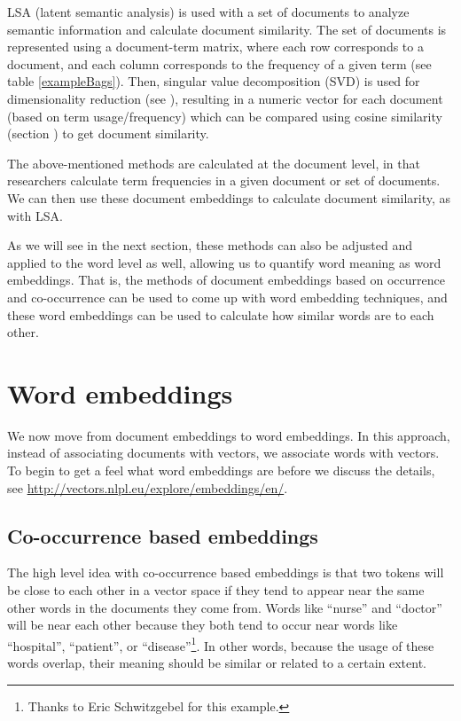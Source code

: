 LSA (latent semantic analysis) is used with a set of documents to analyze semantic information and calculate document similarity. The set of documents is represented using a document-term matrix, where each row corresponds to a document, and each column corresponds to the frequency of a given term (see table \ref{exampleBags}). Then, singular value decomposition (SVD) is used for dimensionality reduction (see ), resulting in a numeric vector for each document (based on term usage/frequency) which can be compared using cosine similarity (section ) to get document similarity.

The above-mentioned methods are calculated at the document level, in that researchers calculate term frequencies in a given document or set of documents. We can then use these document embeddings to calculate document similarity, as with LSA.

As we will see in the next section, these methods can also be adjusted and applied to the word level as well, allowing us to quantify word meaning as word embeddings. That is, the methods of document embeddings based on occurrence and co-occurrence can be used to come up with word embedding techniques, and these word embeddings can be used to calculate how similar words are to each other.

\section{Word embeddings}

We now move from document embeddings to word embeddings. In this approach, instead of associating documents with vectors, we associate words with vectors. To begin to get a feel what word embeddings are before we discuss the details, see \url{http://vectors.nlpl.eu/explore/embeddings/en/}. 

\subsection{Co-occurrence based embeddings}

The high level idea with co-occurrence based embeddings is that two tokens will be close to each other in a vector space if they tend to appear near the same other words in the documents they come from.  Words like ``nurse'' and ``doctor'' will be near each other because they both tend to occur near words like ``hospital'', ``patient'', or ``disease''\footnote{Thanks to Eric Schwitzgebel for this example.}. In other words, because the usage of these words overlap, their meaning should be similar or related to a certain extent.

